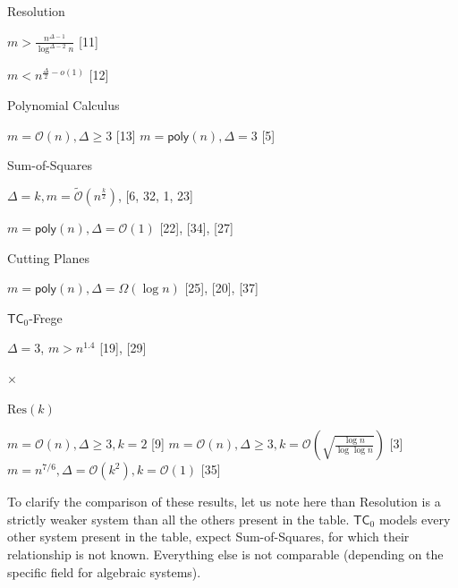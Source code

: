 \documentclass[10pt,a4paper]{article}
\begin{document}
Resolution




$m>\frac{n^{\Delta-1}}{\log^{\Delta-2}n}$ [11]




$m<n^{\frac{\Delta}{2}-o(1)}$ [12]






Polynomial Calculus





$m=\mathcal{O}\left(n\right),\Delta\geq 3$ [13]
$m={\mathsf{poly}}(n),\Delta=3$ [5]






Sum-of-Squares




$\Delta=k,m=\widetilde{\mathcal{O}}(n^{\frac{k}{2}})$,
[6, 32, 1, 23]




$m={\mathsf{poly}}(n),\Delta=\mathcal{O}\left(1\right)$ [22], [34], [27]






Cutting Planes





$m={\mathsf{poly}}(n),\Delta=\Omega(\log n)$
[25], [20], [37]






${\mathsf{TC}}_{0}$-Frege




$\Delta=3$, $m>n^{1.4}$ [19], [29]




$\times$






$\mathrm{Res}(k)$





$m=\mathcal{O}\left(n\right),\Delta\geq 3,k=2$ [9]
$m=\mathcal{O}\left(n\right),\Delta\geq 3,k=\mathcal{O}\left(\sqrt{\frac{\log n%
}{\log\log n}}\right)$
[3]
$m=n^{7/6},\Delta=\mathcal{O}\left(k^{2}\right),k=\mathcal{O}\left(1\right)$ [35]








To clarify the comparison of these results, let us note here than Resolution is a strictly weaker system
than all the others present in the table. ${\mathsf{TC}}_{0}$ models every other system present in the table, expect
Sum-of-Squares, for which their relationship is not known. Everything else is not comparable (depending
on the specific field for algebraic systems).\par
\end{document}

